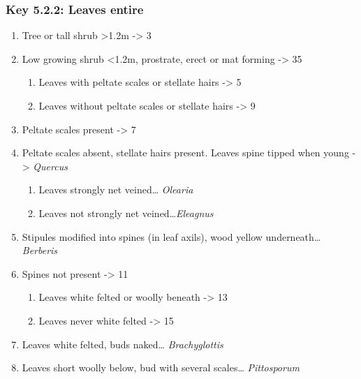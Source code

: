 \documentclass[openany]{book}
\providecommand{\tightlist}{%
  \setlength{\itemsep}{0pt}\setlength{\parskip}{0pt}}
\begin{document}
\hypertarget{key-5.2.2-leaves-entire}{%
\subsubsection{Key 5.2.2: Leaves entire}\label{key-5.2.2-leaves-entire}}

\begin{enumerate}
\def\labelenumi{\arabic{enumi}.}
\tightlist
\item
  Tree or tall shrub \textgreater{}1.2m -\textgreater{} 3
\item
  Low growing shrub \textless{}1.2m, prostrate, erect or mat forming
  -\textgreater{} 35

  \begin{enumerate}
  \def\labelenumii{\arabic{enumii}.}
  \setcounter{enumii}{2}
  \tightlist
  \item
    Leaves with peltate scales or stellate hairs -\textgreater{} 5
  \item
    Leaves without peltate scales or stellate hairs -\textgreater{} 9
  \end{enumerate}
\item
  Peltate scales present -\textgreater{} 7
\item
  Peltate scales absent, stellate hairs present. Leaves spine tipped
  when young -\textgreater{} \emph{Quercus}

  \begin{enumerate}
  \def\labelenumii{\arabic{enumii}.}
  \setcounter{enumii}{6}
  \tightlist
  \item
    Leaves strongly net veined\ldots{} \emph{Olearia}
  \item
    Leaves not strongly net veined\ldots{}\emph{Eleagnus}
  \end{enumerate}
\item
  Stipules modified into spines (in leaf axils), wood yellow
  underneath\ldots{} \emph{Berberis}
\item
  Spines not present -\textgreater{} 11

  \begin{enumerate}
  \def\labelenumii{\arabic{enumii}.}
  \setcounter{enumii}{10}
  \tightlist
  \item
    Leaves white felted or woolly beneath -\textgreater{} 13
  \item
    Leaves never white felted -\textgreater{} 15
  \end{enumerate}
\item
  Leaves white felted, buds naked\ldots{} \emph{Brachyglottis}
\item
  Leaves short woolly below, bud with several scales\ldots{}
  \emph{Pittosporum}


\end{enumerate}
\end{document}
